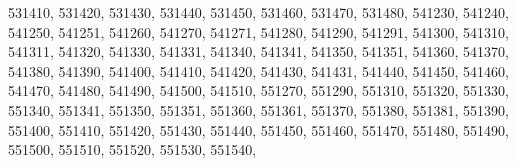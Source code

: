 \textquotesingle{}531410\textquotesingle{}, \textquotesingle{}531420\textquotesingle{}, \textquotesingle{}531430\textquotesingle{}, \textquotesingle{}531440\textquotesingle{}, \textquotesingle{}531450\textquotesingle{}, \textquotesingle{}531460\textquotesingle{}, \textquotesingle{}531470\textquotesingle{}, \textquotesingle{}531480\textquotesingle{}, \textquotesingle{}541230\textquotesingle{}, \textquotesingle{}541240\textquotesingle{}, \textquotesingle{}541250\textquotesingle{}, \textquotesingle{}541251\textquotesingle{}, \textquotesingle{}541260\textquotesingle{}, \textquotesingle{}541270\textquotesingle{}, \textquotesingle{}541271\textquotesingle{}, \textquotesingle{}541280\textquotesingle{}, \textquotesingle{}541290\textquotesingle{}, \textquotesingle{}541291\textquotesingle{}, \textquotesingle{}541300\textquotesingle{}, \textquotesingle{}541310\textquotesingle{}, \textquotesingle{}541311\textquotesingle{}, \textquotesingle{}541320\textquotesingle{}, \textquotesingle{}541330\textquotesingle{}, \textquotesingle{}541331\textquotesingle{}, \textquotesingle{}541340\textquotesingle{}, \textquotesingle{}541341\textquotesingle{}, \textquotesingle{}541350\textquotesingle{}, \textquotesingle{}541351\textquotesingle{}, \textquotesingle{}541360\textquotesingle{}, \textquotesingle{}541370\textquotesingle{}, \textquotesingle{}541380\textquotesingle{}, \textquotesingle{}541390\textquotesingle{}, \textquotesingle{}541400\textquotesingle{}, \textquotesingle{}541410\textquotesingle{}, \textquotesingle{}541420\textquotesingle{}, \textquotesingle{}541430\textquotesingle{}, \textquotesingle{}541431\textquotesingle{}, \textquotesingle{}541440\textquotesingle{}, \textquotesingle{}541450\textquotesingle{}, \textquotesingle{}541460\textquotesingle{}, \textquotesingle{}541470\textquotesingle{}, \textquotesingle{}541480\textquotesingle{}, \textquotesingle{}541490\textquotesingle{}, \textquotesingle{}541500\textquotesingle{}, \textquotesingle{}541510\textquotesingle{}, \textquotesingle{}551270\textquotesingle{}, \textquotesingle{}551290\textquotesingle{}, \textquotesingle{}551310\textquotesingle{}, \textquotesingle{}551320\textquotesingle{}, \textquotesingle{}551330\textquotesingle{}, \textquotesingle{}551340\textquotesingle{}, \textquotesingle{}551341\textquotesingle{}, \textquotesingle{}551350\textquotesingle{}, \textquotesingle{}551351\textquotesingle{}, \textquotesingle{}551360\textquotesingle{}, \textquotesingle{}551361\textquotesingle{}, \textquotesingle{}551370\textquotesingle{}, \textquotesingle{}551380\textquotesingle{}, \textquotesingle{}551381\textquotesingle{}, \textquotesingle{}551390\textquotesingle{}, \textquotesingle{}551400\textquotesingle{}, \textquotesingle{}551410\textquotesingle{}, \textquotesingle{}551420\textquotesingle{}, \textquotesingle{}551430\textquotesingle{}, \textquotesingle{}551440\textquotesingle{}, \textquotesingle{}551450\textquotesingle{}, \textquotesingle{}551460\textquotesingle{}, \textquotesingle{}551470\textquotesingle{}, \textquotesingle{}551480\textquotesingle{}, \textquotesingle{}551490\textquotesingle{}, \textquotesingle{}551500\textquotesingle{}, \textquotesingle{}551510\textquotesingle{}, \textquotesingle{}551520\textquotesingle{}, \textquotesingle{}551530\textquotesingle{}, \textquotesingle{}551540\textquotesingle{}, 